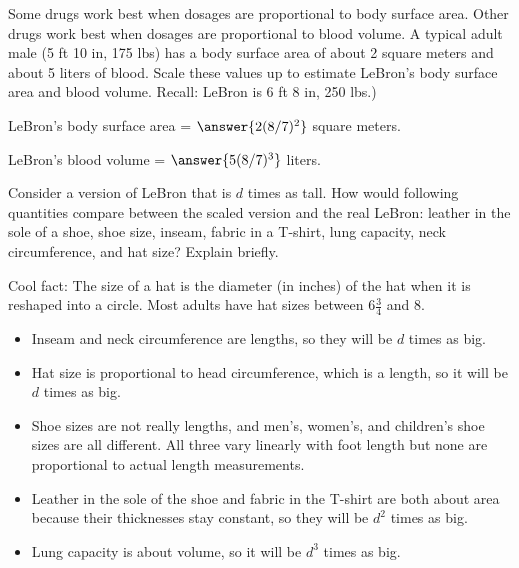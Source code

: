 \documentclass[nooutcomes]{ximera}
\begin{document}
\begin{problem}
Some drugs work best when dosages are proportional to body surface area.  Other drugs work best when dosages are proportional to blood volume.  A typical adult male (5 ft 10 in, 175 lbs)  has a body surface area of about 2 square meters and about 5 liters of blood.  Scale these values up to estimate LeBron's body surface area and blood volume.  Recall:  LeBron is 6 ft 8 in, 250 lbs.)

LeBron's body surface area = $\answer{2(8/7)^2}$ square meters. 

LeBron's blood volume = $\answer{5(8/7)^3}$ liters. 
\end{problem}


\begin{problem}
Consider a version of LeBron that is $d$ times as tall.  How would following quantities compare between the scaled version and the real LeBron:   leather in the sole of a shoe, shoe size, inseam, fabric in a T-shirt, lung capacity, neck circumference, and hat size?  Explain briefly.  

Cool fact:  The size of a hat is the diameter (in inches) of the hat when it is reshaped into a circle.  Most adults have hat sizes between $6\frac{3}{4}$ and $8$.
\begin{hint}
\begin{itemize}
\item Inseam and neck circumference are lengths, so they will be $d$ times as big.  
\item Hat size is proportional to head circumference, which is a length, so it will be $d$ times as big.  
\item Shoe sizes are not really lengths, and men's, women's, and children's shoe sizes are all different.  All three vary linearly with foot length but none are proportional to actual length measurements.   
\item Leather in the sole of the shoe and fabric in the T-shirt are both about area because their thicknesses stay constant, so they will be $d^2$ times as big. 
\item Lung capacity is about volume, so it will be $d^3$ times as big.  
\end{itemize}
\end{hint}
\end{problem}
\end{document}
